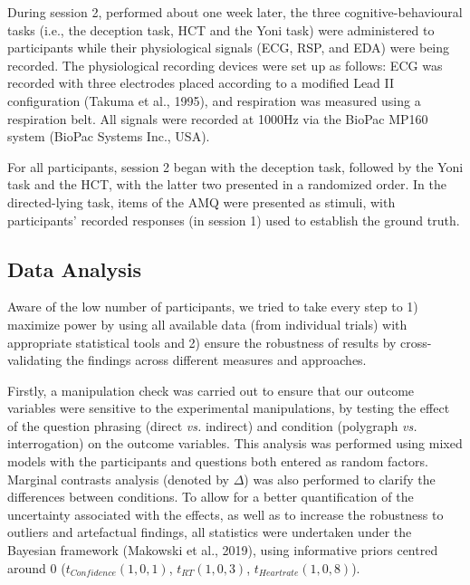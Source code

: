 \documentclass[
  man,mask,floatsintext]{apa6}
\begin{document}
During session 2, performed about one week later, the three cognitive-behavioural tasks (i.e., the deception task, HCT and the Yoni task) were administered to participants while their physiological signals (ECG, RSP, and EDA) were being recorded. The physiological recording devices were set up as follows: ECG was recorded with three electrodes placed according to a modified Lead II configuration (Takuma et al., 1995), and respiration was measured using a respiration belt. All signals were recorded at 1000Hz via the BioPac MP160 system (BioPac Systems Inc., USA).

For all participants, session 2 began with the deception task, followed by the Yoni task and the HCT, with the latter two presented in a randomized order. In the directed-lying task, items of the AMQ were presented as stimuli, with participants' recorded responses (in session 1) used to establish the ground truth.

\subsection{Data Analysis}\label{data-analysis}

Aware of the low number of participants, we tried to take every step to 1) maximize power by using all available data (from individual trials) with appropriate statistical tools and 2) ensure the robustness of results by cross-validating the findings across different measures and approaches.

Firstly, a manipulation check was carried out to ensure that our outcome variables were sensitive to the experimental manipulations, by testing the effect of the question phrasing (direct \emph{vs.} indirect) and condition (polygraph \emph{vs.} interrogation) on the outcome variables. This analysis was performed using mixed models with the participants and questions both entered as random factors. Marginal contrasts analysis (denoted by \(\Delta\)) was also performed to clarify the differences between conditions. To allow for a better quantification of the uncertainty associated with the effects, as well as to increase the robustness to outliers and artefactual findings, all statistics were undertaken under the Bayesian framework (Makowski et al., 2019), using informative priors centred around 0 (\(t_{Confidence}(1, 0, 1)\), \(t_{RT}(1, 0, 3)\), \(t_{Heartrate}(1, 0, 8)\)).
\end{document}
